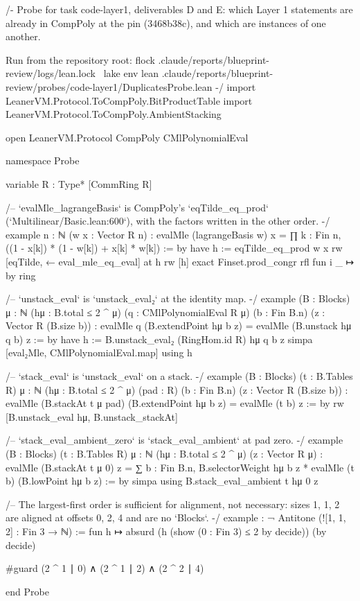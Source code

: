 \begin{leancode}
/-
  Probe for task code-layer1, deliverables D and E: which Layer 1 statements are already in
  CompPoly at the pin (3468b38c), and which are instances of one another.

  Run from the repository root:
    flock .claude/reports/blueprint-review/logs/lean.lock \
      lake env lean .claude/reports/blueprint-review/probes/code-layer1/DuplicatesProbe.lean
-/
import LeanerVM.Protocol.ToCompPoly.BitProductTable
import LeanerVM.Protocol.ToCompPoly.AmbientStacking

open LeanerVM.Protocol CompPoly CMlPolynomialEval

namespace Probe

variable {R : Type*} [CommRing R]

/-- `evalMle_lagrangeBasis` is CompPoly's `eqTilde_eq_prod` (`Multilinear/Basic.lean:600`),
with the factors written in the other order. -/
example {n : ℕ} (w x : Vector R n) :
    evalMle (lagrangeBasis w) x = ∏ k : Fin n, ((1 - x[k]) * (1 - w[k]) + x[k] * w[k]) := by
  have h := eqTilde_eq_prod w x
  rw [eqTilde, ← eval_mle_eq_eval] at h
  rw [h]
  exact Finset.prod_congr rfl fun i _ ↦ by ring

/-- `unstack_eval` is `unstack_eval₂` at the identity map. -/
example (B : Blocks) {μ : ℕ} (hμ : B.total ≤ 2 ^ μ) (q : CMlPolynomialEval R μ) (b : Fin B.n)
    (z : Vector R (B.size b)) :
    evalMle q (B.extendPoint hμ b z) = evalMle (B.unstack hμ q b) z := by
  have h := B.unstack_eval₂ (RingHom.id R) hμ q b z
  simpa [eval₂Mle, CMlPolynomialEval.map] using h

/-- `stack_eval` is `unstack_eval` on a stack. -/
example (B : Blocks) (t : B.Tables R) {μ : ℕ} (hμ : B.total ≤ 2 ^ μ) (pad : R) (b : Fin B.n)
    (z : Vector R (B.size b)) :
    evalMle (B.stackAt t μ pad) (B.extendPoint hμ b z) = evalMle (t b) z := by
  rw [B.unstack_eval hμ, B.unstack_stackAt]

/-- `stack_eval_ambient_zero` is `stack_eval_ambient` at pad zero. -/
example (B : Blocks) (t : B.Tables R) {μ : ℕ} (hμ : B.total ≤ 2 ^ μ) (z : Vector R μ) :
    evalMle (B.stackAt t μ 0) z =
      ∑ b : Fin B.n, B.selectorWeight hμ b z * evalMle (t b) (B.lowPoint hμ b z) := by
  simpa using B.stack_eval_ambient t hμ 0 z

/-- The largest-first order is sufficient for alignment, not necessary: sizes 1, 1, 2 are
aligned at offsets 0, 2, 4 and are no `Blocks`. -/
example : ¬ Antitone (![1, 1, 2] : Fin 3 → ℕ) := fun h ↦
  absurd (h (show (0 : Fin 3) ≤ 2 by decide)) (by decide)

#guard (2 ^ 1 ∣ 0) ∧ (2 ^ 1 ∣ 2) ∧ (2 ^ 2 ∣ 4)

end Probe
\end{leancode}


